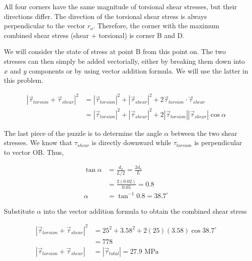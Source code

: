 \documentclass[a4paper,openany,12pt]{book}
\begin{document}
{{All four corners have the same magnitude of torsional shear stresses,
but their directions differ. The direction of the torsional shear stress
is always perpendicular to the vector \(r_o\). Therefore, the corner with
the maximum combined shear stress (shear + torsional) is corner B and D.


We will consider the state of stress at point B from this point on. The
two stresses can then simply be added vectorially, either by breaking
them down into \(x\) and \(y\) components or by using vector addition
formula. We will use the latter in this problem.

$$\begin{aligned}
    \left| \vec{\tau}_{torsion} + \vec{\tau}_{shear} \right|^2 &= \left| \vec{\tau}_{torsion} \right|^2 + \left| \vec{\tau}_{shear} \right|^2 + 2 \vec{\tau}_{torsion} \cdot \vec{\tau}_{shear} \\
                                                               &= \left| \vec{\tau}_{torsion} \right|^2 + \left| \vec{\tau}_{shear} \right|^2 + 2 \left| \vec{\tau}_{torsion} \right| \left| \vec{\tau}_{shear} \right| \cos \alpha
  \end{aligned}$$

The last piece of the puzzle is to determine the angle \(\alpha\) between
the two shear stresses. We know that \(\tau_{shear}\) is directly downward
while \(\tau_{torsion}\) is perpendicular to vector OB. Thus,

$$\begin{aligned}
    \tan \alpha &= \frac{d_o}{L/2} = \frac{2 d_o}{L} \\
                &= \frac{2(0.02)}{0.05} = 0.8 \\
    \alpha &= \tan^{-1} 0.8 = 38.7^{\circ}
  \end{aligned}$$

Substitute \(\alpha\) into the vector addition formula to obtain the
combined shear stress

$$\begin{aligned}
    \left| \vec{\tau}_{torsion} + \vec{\tau}_{shear} \right|^2 &= 25^2 + 3.58^2 + 2(25)(3.58) \cos 38.7^{\circ} \\
                                                               &= 778 \\
    \left| \vec{\tau}_{torsion} + \vec{\tau}_{shear} \right| &= \left| \vec{\tau}_{total} \right| = 27.9 \text{ MPa}                                                        
  \end{aligned}$$

}}
\end{document}
